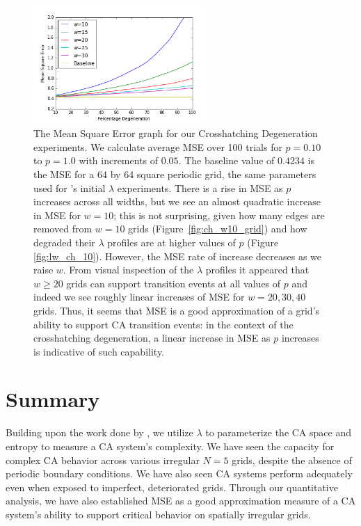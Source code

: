 \documentclass[a4paper,11pt,twoside]{report}
\begin{document}
\begin{figure}[htp]
\centering
\includegraphics[width=0.6\textwidth]{ch6_figs/ch_mse_10_30}
\caption[Mean Squared Error for Crosshatching Degeneration]{
  The Mean Square Error graph for our Crosshatching Degeneration experiments. We calculate average MSE over 100 trials for $p=0.10$ to $p=1.0$ with increments of $0.05$. The baseline value of $0.4234$ is the MSE for a 64 by 64 square periodic grid, the same parameters used for \citeauthor{wo90}'s initial $\lambda$ experiments. There is a rise in MSE as $p$ increases across all widths, but we see an almost quadratic increase in MSE for $w=10$; this is not surprising, given how many edges are removed from $w=10$ grids (Figure~\ref{fig:ch_w10_grid}) and how degraded their $\lambda$ profiles are at higher values of $p$ (Figure  \ref{fig:lw_ch_10}). However, the MSE rate of increase decreases as we raise $w$. From visual inspection of the $\lambda$ profiles it appeared that $w \ge 20$ grids can support transition events at all values of $p$ and indeed we see roughly linear increases of MSE for $w=20,30,40$ grids. Thus, it seems that MSE is a good approximation of a grid's ability to support CA transition events: in the context of the crosshatching degeneration, a linear increase in MSE as $p$ increases is indicative of such capability. 
}
\label{fig:ch_mse}
\end{figure}

\section{Summary}

Building upon the work done by \citeauthor{wo90}, we utilize $\lambda$ to parameterize the CA space and entropy to measure a CA system's complexity. We have seen the capacity for complex CA behavior across various irregular $N=5$ grids, despite the absence of periodic boundary conditions. We have also seen CA systems perform adequately even when exposed to imperfect, deteriorated grids. Through our quantitative analysis, we have also established MSE as a good approximation measure of a CA system's ability to support critical behavior on spatially irregular grids.
\end{document}
